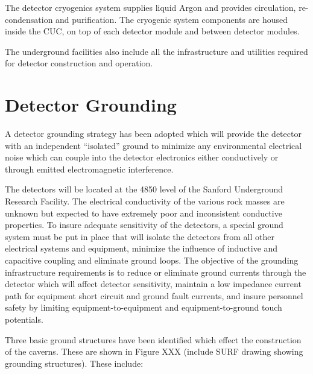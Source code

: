 The detector cryogenics system supplies liquid Argon and provides
circulation, re-condensation and purification. The cryogenic system
components are housed inside the CUC, on top of each detector module
and between detector modules.

The underground facilities also include all the infrastructure and
utilities required for detector construction and operation.

\section{Detector Grounding}
\label{sec:fdsp-coord-faci-grounding}

A detector grounding strategy has been adopted which will provide the
detector with an independent ``isolated'' ground to minimize any
environmental electrical noise which can couple into the detector
electronics either conductively or through emitted electromagnetic
interference.

The detectors will be located at the 4850 level of the Sanford
Underground Research Facility. The electrical conductivity of the
various rock masses are unknown but expected to have extremely poor
and inconsistent conductive properties. To insure adequate sensitivity
of the detectors, a special ground system must be put in place that
will isolate the detectors from all other electrical systems and
equipment, minimize the influence of inductive and capacitive coupling
and eliminate ground loops. The objective of the grounding
infrastructure requirements is to reduce or eliminate ground currents
through the detector which will affect detector sensitivity, maintain
a low impedance current path for equipment short circuit and ground
fault currents, and insure personnel safety by limiting
equipment-to-equipment and equipment-to-ground touch potentials.

Three basic ground structures have been identified which effect the
construction of the caverns.  These are shown in Figure XXX (include
SURF drawing showing grounding structures). These include:

